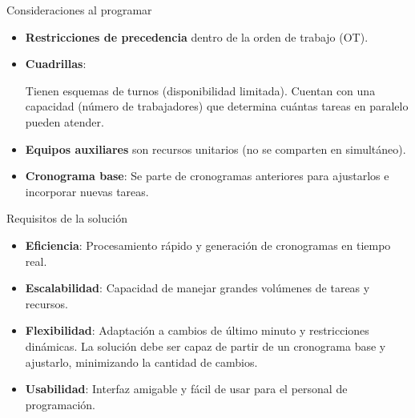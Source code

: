 \documentclass[pdfpagelabels=false, usepdftitle=false, aspectratio=169]{beamer}
\begin{document}
\begin{frame}{Consideraciones al programar}
\begin{itemize}
    \item \textbf{Restricciones de precedencia} dentro de la orden de trabajo (OT).
    \vfill
    \item \textbf{Cuadrillas}:
    \begin{itemize}
      \arrowitem Tienen esquemas de turnos (disponibilidad limitada).
      \arrowitem Cuentan con una capacidad (número de trabajadores) que determina cuántas tareas en paralelo pueden atender.
    \end{itemize}
    \vfill
    \item \textbf{Equipos auxiliares} son recursos unitarios (no se comparten en simultáneo).
    \vfill
    \item \textbf{Cronograma base}: Se parte de cronogramas anteriores para ajustarlos e incorporar nuevas tareas.
    \vfill
\end{itemize}
\vfill
\end{frame}

\begin{frame}{Requisitos de la solución}
    \begin{itemize}
        \item \textbf{Eficiencia}: Procesamiento rápido y generación de cronogramas en tiempo real.
        \vfill
        \item \textbf{Escalabilidad}: Capacidad de manejar grandes volúmenes de tareas y recursos.
        \vfill
        \item \textbf{Flexibilidad}: Adaptación a cambios de último minuto y restricciones dinámicas. La solución debe ser capaz de partir de un cronograma base y ajustarlo, minimizando la cantidad de cambios.
        \vfill
        \item \textbf{Usabilidad}: Interfaz amigable y fácil de usar para el personal de programación. 
    \end{itemize}
    \vfill
    \end{frame}
    
\end{document}
